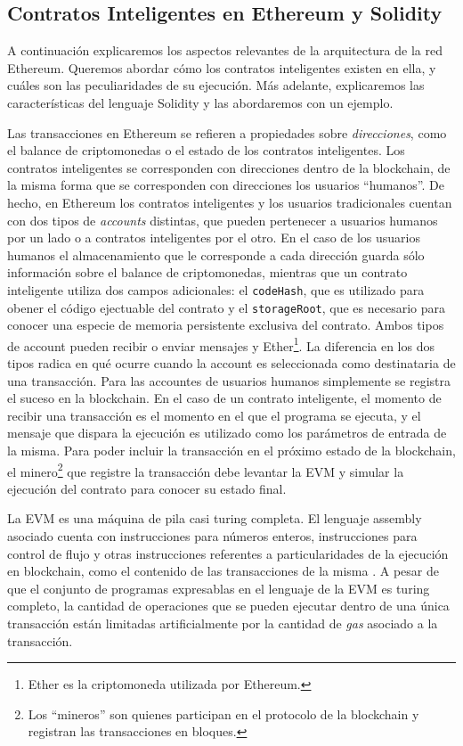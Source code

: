 \subsection{Contratos Inteligentes en Ethereum y Solidity}
A continuación explicaremos los aspectos relevantes de la arquitectura de la red Ethereum.
Queremos abordar cómo los contratos inteligentes existen en ella, y cuáles son las peculiaridades de su ejecución.
Más adelante, explicaremos las características del lenguaje Solidity y las abordaremos con un ejemplo.

Las transacciones en Ethereum se refieren a propiedades sobre \textit{direcciones}, como el balance de criptomonedas o el estado de los contratos inteligentes.
Los contratos inteligentes se corresponden con direcciones dentro de la blockchain, de la misma forma que se corresponden con direcciones los usuarios ``humanos''.
De hecho, en Ethereum los contratos inteligentes y los usuarios tradicionales cuentan con dos tipos de \textit{accounts} distintas, que pueden pertenecer a usuarios humanos por un lado o a contratos inteligentes por el otro.
En el caso de los usuarios humanos el almacenamiento que le corresponde a cada dirección guarda sólo información sobre el balance de criptomonedas, mientras que un contrato inteligente utiliza dos campos adicionales: el \texttt{codeHash}, que es utilizado para obener el código ejectuable del contrato y el \texttt{storageRoot}, que es necesario para conocer una especie de memoria persistente exclusiva del contrato.
Ambos tipos de account pueden recibir o enviar mensajes y Ether\footnote{Ether es la criptomoneda utilizada por Ethereum.}.
La diferencia en los dos tipos radica en qué ocurre cuando la account es seleccionada como destinataria de una transacción.
Para las accountes de usuarios humanos simplemente se registra el suceso en la blockchain.
En el caso de un contrato inteligente, el momento de recibir una transacción es el momento en el que el programa se ejecuta, y el mensaje que dispara la ejecución es utilizado como los parámetros de entrada de la misma.
Para poder incluir la transacción en el próximo estado de la blockchain, el minero\footnote{Los ``mineros'' son quienes participan en el protocolo de la blockchain y registran las transacciones en bloques.} que registre la transacción debe levantar la EVM y simular la ejecución del contrato para conocer su estado final.

La EVM es una máquina de pila casi turing completa.
El lenguaje assembly asociado cuenta con instrucciones para números enteros, instrucciones para control de flujo y otras instrucciones referentes a particularidades de la ejecución en blockchain, como el contenido de las transacciones de la misma \cite{evm-opcodes}.
A pesar de que el conjunto de programas expresablas en el lenguaje de la EVM es turing completo, la cantidad de operaciones que se pueden ejecutar dentro de una única transacción están limitadas artificialmente por la cantidad de \textit{gas} asociado a la transacción.

